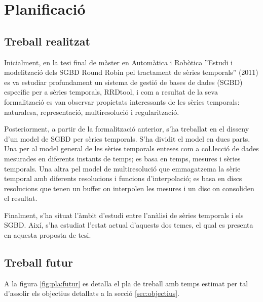 \chapter{Planificació}

\section{Treball realitzat}


Inicialment, en la tesi final de màster en Automàtica i Robòtica
''Estudi i modelització dels SGBD Round Robin pel tractament de sèries
temporals'' (2011) es va estudiar profundament un sistema de gestió de
bases de dades (SGBD) específic per a sèries temporals, RRDtool, i com
a resultat de la seva formalització es van observar propietats
interessants de les sèries temporals: naturalesa, representació,
multiresolució i regularització.

Posteriorment, a partir de la formalització anterior, s'ha treballat
en el disseny d'un model de SGBD per sèries temporals.  S'ha dividit
el model en dues parts. Una per al model general de les sèries
temporals enteses com a co\l.lecció de dades mesurades en diferents
instants de temps; es basa en temps, mesures i sèries temporals. Una
altra pel model de multiresolució que emmagatzema la sèrie temporal
amb diferents resolucions i funcions d'interpolació; es basa en discs
resolucions que tenen un buffer on interpolen les mesures i un disc on
consoliden el resultat.


Finalment, s'ha situat l'àmbit d'estudi entre l'anàlisi de sèries
temporals i els SGBD. Així, s'ha estudiat l'estat actual d'aquests dos
temes, el qual es presenta en aquesta proposta de tesi.



\section{Treball futur}


A la figura \ref{fig:pla:futur} es detalla el pla de treball amb temps
estimat per tal d'assolir els objectius detallats a la secció
\ref{sec:objectius}.

